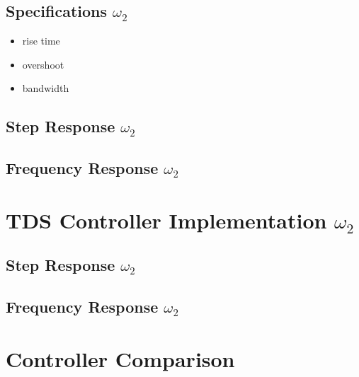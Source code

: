 \documentclass[11pt,titlepage]{article}
\begin{document}
	\subsection{Specifications $\omega_2$}
		\begin{itemize}
			\item rise time
			\item overshoot
			\item bandwidth
		\end{itemize}

	\subsection{Step Response $\omega_2$}

	\subsection{Frequency Response $\omega_2$}

\section{TDS Controller Implementation $\omega_2$}

	\subsection{Step Response $\omega_2$}

	\subsection{Frequency Response $\omega_2$}

\section{Controller Comparison}
\end{document}
